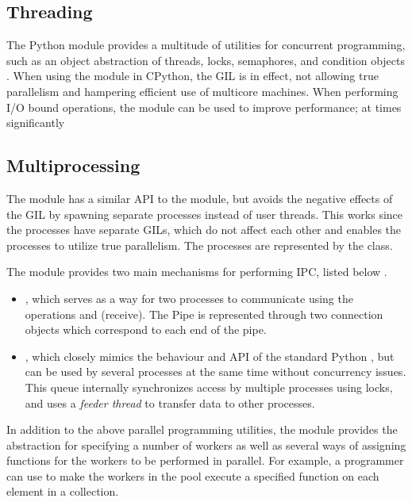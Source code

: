 \subsection{Threading}
The Python  module provides a multitude of utilities for concurrent programming, such as an object abstraction of
threads, locks, semaphores, and condition objects \cite{16_1thtip2d}. When using the  module in CPython, the GIL is in
effect, not allowing true parallelism and hampering efficient use of multicore machines. When performing I/O bound operations, the
 module can be used to improve performance; at times significantly \cite[p. 121-124]{slatkin_2015_effective_ep5swtwbp}

\subsection{Multiprocessing}
The  module has a similar API to the  module, but avoids the negative effects of the GIL by spawning
separate processes instead of user threads. This works since the processes have separate GILs, which do not affect each other and
enables the processes to utilize true parallelism. The processes are represented by the  class.

The  module provides two main mechanisms for performing IPC, listed below \cite{palach_2014_parallel_ppwp}.

\begin{itemize}
  \item {}, which serves as a way for two processes to communicate using the operations 
    and  (receive). The Pipe is represented through two connection objects which correspond to each end of the pipe.
  \item {}, which closely mimics the behaviour and API of the standard Python , but
    can be used by several processes at the same time without concurrency issues. This  queue internally
    synchronizes access by multiple processes using locks, and uses a \emph{feeder thread} to transfer data to other processes.
\end{itemize}

In addition to the above parallel programming utilities, the  module provides the  abstraction
for specifying a number of workers as well as several ways of assigning functions for the workers to be performed in parallel. For
example, a programmer can use  to make the workers in the pool execute a specified function on each element in a
collection.

